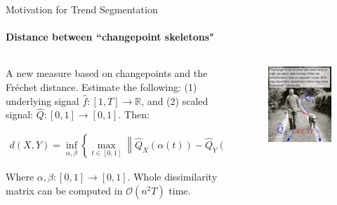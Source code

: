 \documentclass{beamer}
\begin{document}

\begin{frame}{Motivation for Trend Segmentation}
\framesubtitle{Distance between ``changepoint skeletons"}

\begin{columns}

    \begin{column}{0.6\textwidth}
    {\small
    A new measure based on changepoints and the Fréchet distance. Estimate the following: (1) underlying signal  $\widehat{f}: [1,T] \rightarrow \mathbb{R}$, and (2) scaled signal: $\widehat{Q}: [0,1] \rightarrow [0,1]$. Then:

    \begin{align*}
        d(X,Y) = \underset{\alpha,\beta}{\inf} \left \{ \underset{t \in [0,1]}{\max} \left \| \widehat{Q}_X\left ( \alpha(t) \right ) - \widehat{Q}_Y\left ( \beta(t) \right ) \right \| \right \}
    \end{align*}
    
    \text{}
    
    Where $\alpha, \beta : [0,1] \rightarrow [0,1]$. Whole dissimilarity matrix can be computed in $\mathcal{O} \left ( n^2T \right )$ time. 
    }
    \end{column}
    
    \begin{column}{0.4\textwidth}
    \begin{figure}
        \centering
        \includegraphics[width = 1\textwidth,left]{../plots/frechet_dist_illustration.jpg}
    \end{figure}
    \end{column}
    

\end{columns}
\end{frame}
\end{document}
